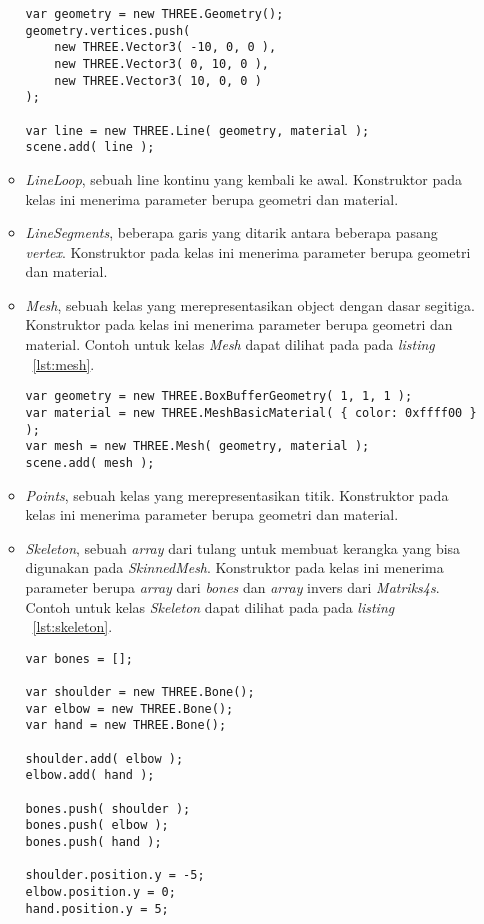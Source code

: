 \begin{itemize}
\begin{itemize}
\begin{lstlisting}[caption={Contoh penggunaan kelas {\it Line}.}, label={lst:line},captionpos=b]
var geometry = new THREE.Geometry();
geometry.vertices.push(
	new THREE.Vector3( -10, 0, 0 ),
	new THREE.Vector3( 0, 10, 0 ),
	new THREE.Vector3( 10, 0, 0 )
);

var line = new THREE.Line( geometry, material );
scene.add( line );
\end{lstlisting}
		\item {\it LineLoop}, sebuah line kontinu yang kembali ke awal. Konstruktor pada kelas ini menerima parameter berupa geometri dan material.
		\item {\it LineSegments}, beberapa garis yang ditarik antara beberapa pasang {\it vertex}. Konstruktor pada kelas ini menerima parameter berupa geometri dan material.
		\item {\it Mesh}, sebuah kelas yang merepresentasikan object dengan dasar segitiga. Konstruktor pada kelas ini menerima parameter berupa geometri dan material. Contoh untuk kelas {\it Mesh} dapat dilihat pada pada {\it listing} ~\ref{lst:mesh}.
\begin{lstlisting}[caption={Contoh penggunaan kelas {\it Mesh}.}, label={lst:mesh},captionpos=b]
var geometry = new THREE.BoxBufferGeometry( 1, 1, 1 );
var material = new THREE.MeshBasicMaterial( { color: 0xffff00 } );
var mesh = new THREE.Mesh( geometry, material );
scene.add( mesh );
\end{lstlisting}
		\item {\it Points}, sebuah kelas yang merepresentasikan titik. Konstruktor pada kelas ini menerima parameter berupa geometri dan material.
		\item {\it Skeleton}, sebuah {\it array} dari tulang untuk membuat kerangka yang bisa digunakan pada {\it SkinnedMesh}. Konstruktor pada kelas ini menerima parameter berupa {\it array} dari {\it bones} dan {\it array} invers dari {\it Matriks4s}. Contoh untuk kelas {\it Skeleton} dapat dilihat pada pada {\it listing} ~\ref{lst:skeleton}.
\begin{lstlisting}[caption={Contoh penggunaan kelas {\it Skeleton}.}, label={lst:skeleton},captionpos=b]
var bones = [];

var shoulder = new THREE.Bone();
var elbow = new THREE.Bone();
var hand = new THREE.Bone();

shoulder.add( elbow );
elbow.add( hand );

bones.push( shoulder );
bones.push( elbow );
bones.push( hand );

shoulder.position.y = -5;
elbow.position.y = 0;
hand.position.y = 5;


\end{lstlisting}
\end{itemize}
\end{itemize}
